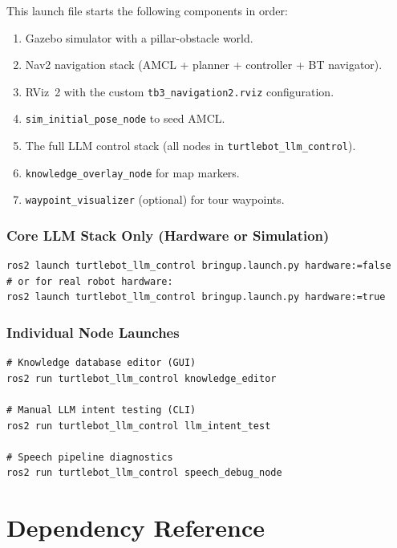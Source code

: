 \documentclass[12pt,a4paper]{report}
\newcommand{\pkg}[1]{\texttt{\color{RoyalBlue}#1}}
\newcommand{\file}[1]{\texttt{\color{black!70}#1}}
\newcommand{\node}[1]{\texttt{\color{Maroon}#1}}
\begin{document}
This launch file starts the following components in order:

\begin{enumerate}[leftmargin=2em]
  \item Gazebo simulator with a pillar-obstacle world.
  \item Nav2 navigation stack (AMCL + planner + controller + BT navigator).
  \item RViz~2 with the custom \file{tb3\_navigation2.rviz} configuration.
  \item \node{sim\_initial\_pose\_node} to seed AMCL.
  \item The full LLM control stack (all nodes in \pkg{turtlebot\_llm\_control}).
  \item \node{knowledge\_overlay\_node} for map markers.
  \item \node{waypoint\_visualizer} (optional) for tour waypoints.
\end{enumerate}

\subsection{Core LLM Stack Only (Hardware or Simulation)}

\begin{lstlisting}[style=bashstyle, caption={Start only the LLM control nodes}]
ros2 launch turtlebot_llm_control bringup.launch.py hardware:=false
# or for real robot hardware:
ros2 launch turtlebot_llm_control bringup.launch.py hardware:=true
\end{lstlisting}

\subsection{Individual Node Launches}

\begin{lstlisting}[style=bashstyle, caption={Run individual nodes for testing}]
# Knowledge database editor (GUI)
ros2 run turtlebot_llm_control knowledge_editor

# Manual LLM intent testing (CLI)
ros2 run turtlebot_llm_control llm_intent_test

# Speech pipeline diagnostics
ros2 run turtlebot_llm_control speech_debug_node
\end{lstlisting}

\chapter{Dependency Reference}
\label{ch:deps}
\end{document}
